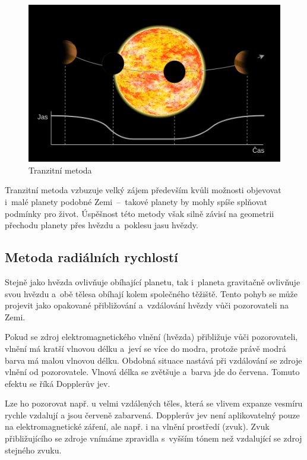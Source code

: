 \documentclass[a4paper,12pt]{article}
\begin{document}
\begin{figure}[!htb]
\begin{center}
\includegraphics[width=\textwidth]{img/transit.png}
\caption[Tranzitní metoda]{Tranzitní metoda \footnotemark[1]}
\end{center}
\end{figure}


Tranzitní metoda vzbuzuje velký zájem především kvůli možnosti objevovat i~malé planety podobné Zemi~--~takové planety by mohly spíše splňovat podmínky pro život. Úspěšnost této metody však silně závisí na geometrii přechodu planety přes hvězdu a~poklesu jasu hvězdy.


\clearpage

\subsection{Metoda radiálních rychlostí}

Stejně jako hvězda ovlivňuje obíhající planetu, tak i~planeta gravitačně ovlivňuje svou hvězdu a~obě tělesa obíhají kolem společného těžiště. Tento pohyb se může projevit jako opakované přibližování a~vzdálování hvězdy vůči pozorovateli na Zemi.

Pokud se zdroj elektromagnetického vlnění (hvězda) přibližuje vůči pozorovateli, vlnění má kratší vlnovou délku a~jeví se více do modra, protože právě modrá barva má malou vlnovou délku. Obdobná situace nastává při vzdálování se zdroje vlnění od pozorovatele. Vlnová délka se zvětšuje a~barva jde do červena. Tomuto efektu se říká Dopplerův jev.

Lze ho pozorovat např. u velmi vzdálených těles, která se vlivem expanze vesmíru rychle vzdalují a jsou červeně zabarvená. Dopplerův jev není aplikovatelný pouze na elektromagnetické záření, ale např. i na vlnění prostředí (zvuk). Zvuk přibližujícího se zdroje vnímáme zpravidla s~vyšším tónem než vzdalující se zdroj stejného zvuku.
\end{document}
